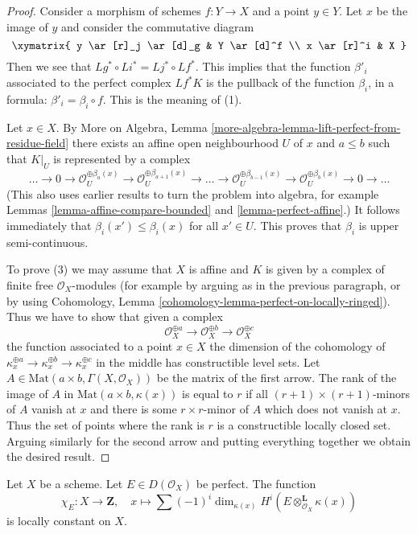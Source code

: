 \begin{proof}
Consider a morphism of schemes $f : Y \to X$ and a point $y \in Y$.
Let $x$ be the image of $y$ and consider the commutative diagram
$$
\xymatrix{
y \ar[r]_j \ar[d]_g & Y \ar[d]^f \\
x \ar[r]^i & X
}
$$
Then we see that $Lg^* \circ Li^* = Lj^* \circ Lf^*$. This implies that
the function $\beta'_i$ associated to the perfect complex $Lf^*K$
is the pullback of the function $\beta_i$, in a formula:
$\beta'_i = \beta_i \circ f$. This is the meaning of (1).

\medskip\noindent
Let $x \in X$. By More on Algebra, Lemma
\ref{more-algebra-lemma-lift-perfect-from-residue-field}
there exists an affine open neighbourhood $U$ of $x$ and
$a \leq b$ such that $K|_U$ is represented by a complex
$$
\ldots \to 0 \to \mathcal{O}_U^{\oplus \beta_a(x)}
\to \mathcal{O}_U^{\oplus \beta_{a + 1}(x)} \to
\ldots \to
\mathcal{O}_U^{\oplus \beta_{b - 1}(x)} \to
\mathcal{O}_U^{\oplus \beta_b(x)} \to 0
\to \ldots
$$
(This also uses earlier results to turn the problem into algebra, for example
Lemmas \ref{lemma-affine-compare-bounded} and
\ref{lemma-perfect-affine}.)
It follows immediately that $\beta_i(x') \leq \beta_i(x)$
for all $x' \in U$. This proves that $\beta_i$ is upper
semi-continuous.

\medskip\noindent
To prove (3) we may assume that $X$ is affine and
$K$ is given by a complex of finite
free $\mathcal{O}_X$-modules (for example by arguing as in the previous
paragraph, or by using Cohomology, Lemma
\ref{cohomology-lemma-perfect-on-locally-ringed}).
Thus we have to show that given a complex
$$
\mathcal{O}_X^{\oplus a} \to
\mathcal{O}_X^{\oplus b} \to
\mathcal{O}_X^{\oplus c}
$$
the function associated to a point $x \in X$ the dimension of the cohomology
of $\kappa_x^{\oplus a} \to \kappa_x^{\oplus b} \to \kappa_x^{\oplus c}$
in the middle has constructible level sets. Let
$A \in \text{Mat}(a \times b, \Gamma(X, \mathcal{O}_X))$ be the matrix
of the first arrow. The rank of the image of $A$ in
$\text{Mat}(a \times b, \kappa(x))$ is equal to $r$ if all
$(r + 1) \times (r + 1)$-minors of $A$ vanish at $x$ and there is some
$r \times r$-minor of $A$ which does not vanish at $x$. Thus the set
of points where the rank is $r$ is a constructible locally closed set.
Arguing similarly for the second arrow and putting everything together
we obtain the desired result.
\end{proof}

\begin{lemma}
\label{lemma-chi-locally-constant}
Let $X$ be a scheme. Let $E \in D(\mathcal{O}_X)$ be perfect.
The function
$$
\chi_E : X \longrightarrow \mathbf{Z},\quad
x \longmapsto \sum (-1)^i
\dim_{\kappa(x)} H^i(E \otimes_{\mathcal{O}_X}^\mathbf{L} \kappa(x))
$$
is locally constant on $X$.
\end{lemma}

